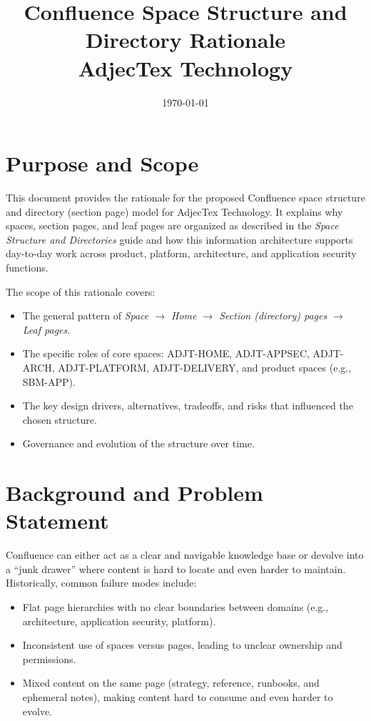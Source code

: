 \documentclass[11pt]{article}
\title{Confluence Space Structure and Directory Rationale\\[4pt]
       \large AdjecTex Technology}
\author{}
\date{\today}
\begin{document}
\maketitle
\tableofcontents
\newpage

\section{Purpose and Scope}

This document provides the rationale for the proposed Confluence
space structure and directory (section page) model for AdjecTex
Technology. It explains why spaces, section pages, and leaf pages
are organized as described in the \emph{Space Structure and
Directories} guide and how this information architecture supports
day-to-day work across product, platform, architecture, and
application security functions.

The scope of this rationale covers:

\begin{itemize}[leftmargin=*]
  \item The general pattern of \emph{Space $\rightarrow$ Home $\rightarrow$
        Section (directory) pages $\rightarrow$ Leaf pages}.
  \item The specific roles of core spaces:
        ADJT-HOME, ADJT-APPSEC, ADJT-ARCH, ADJT-PLATFORM,
        ADJT-DELIVERY, and product spaces (e.g., SBM-APP).
  \item The key design drivers, alternatives, tradeoffs, and risks
        that influenced the chosen structure.
  \item Governance and evolution of the structure over time.
\end{itemize}

\section{Background and Problem Statement}

Confluence can either act as a clear and navigable knowledge base
or devolve into a ``junk drawer'' where content is hard to locate
and even harder to maintain. Historically, common failure modes
include:

\begin{itemize}[leftmargin=*]
  \item Flat page hierarchies with no clear boundaries between
        domains (e.g., architecture, application security, platform).
  \item Inconsistent use of spaces versus pages, leading to unclear
        ownership and permissions.
  \item Mixed content on the same page (strategy, reference,
        runbooks, and ephemeral notes), making content hard to
        consume and even harder to evolve.
\end{itemize}
\end{document}
